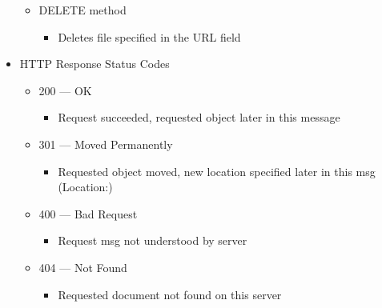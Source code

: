 \begin{itemize}
\begin{itemize}
\begin{itemize}
        \end{itemize}

      \item DELETE method

        \begin{itemize}

          \item Deletes file specified in the URL field

        \end{itemize}

    \end{itemize}

  \item HTTP Response Status Codes

    \begin{itemize}

      \item 200 — OK

        \begin{itemize}

          \item Request succeeded, requested object later in this message

        \end{itemize}

      \item 301 — Moved Permanently

        \begin{itemize}

          \item Requested object moved, new location specified later in this msg (Location:)

        \end{itemize}

      \item 400 — Bad Request

        \begin{itemize}

          \item Request msg not understood by server

        \end{itemize}

      \item 404 — Not Found

        \begin{itemize}

          \item Requested document not found on this server


\end{itemize}
\end{itemize}
\end{itemize}
